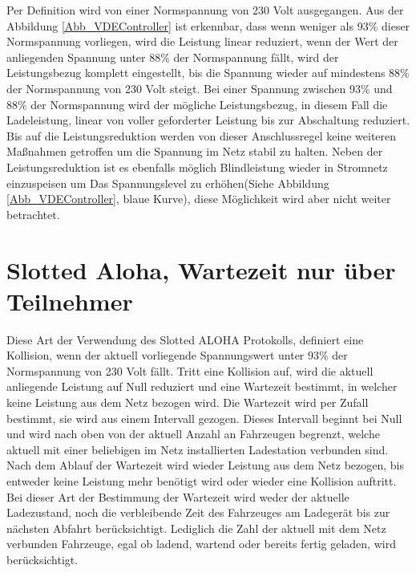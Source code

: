 Per Definition wird von einer Normspannung von 230 Volt ausgegangen. Aus der Abbildung \ref{Abb_VDEController} ist erkennbar, dass wenn weniger als 93\% dieser Normspannung vorliegen, wird die Leistung linear reduziert, wenn der Wert der anliegenden Spannung unter 88\% der Normspannung fällt, wird der Leistungsbezug komplett eingestellt, bis die Spannung wieder auf mindestens 88\% der Normspannung von 230 Volt steigt. Bei einer Spannung zwischen 93\% und 88\% der Normspannung wird der mögliche Leistungsbezug, in diesem Fall die Ladeleistung, linear von voller geforderter Leistung bis zur Abschaltung reduziert.\\
Bis auf die Leistungsreduktion werden von dieser Anschlussregel keine weiteren Maßnahmen getroffen um die Spannung im Netz stabil zu halten. 
Neben der Leistungsreduktion ist es ebenfalls möglich Blindleistung wieder in Stromnetz einzuspeisen um Das Spannungslevel zu erhöhen(Siehe Abbildung \ref{Abb_VDEController}, blaue Kurve), diese Möglichkeit wird aber nicht weiter betrachtet.

\section{Slotted Aloha, Wartezeit nur über Teilnehmer}
\label{cap:background_sec:SA_participants}
Diese Art der Verwendung des Slotted ALOHA Protokolls, definiert eine Kollision, wenn der aktuell vorliegende Spannungswert unter 93\% der Normspannung von 230 Volt fällt. Tritt eine Kollision auf, wird die aktuell anliegende Leistung auf Null reduziert und eine Wartezeit bestimmt, in welcher keine Leistung aus dem Netz bezogen wird. Die Wartezeit wird per Zufall bestimmt, sie wird aus einem Intervall gezogen. Dieses Intervall beginnt  bei Null und wird nach oben von der aktuell Anzahl an Fahrzeugen begrenzt, welche aktuell mit einer beliebigen im Netz installierten Ladestation verbunden sind. Nach dem Ablauf der Wartezeit wird wieder Leistung aus dem Netz bezogen, bis entweder keine Leistung mehr benötigt wird oder wieder eine Kollision auftritt.
Bei dieser Art der Bestimmung der Wartezeit wird weder der aktuelle Ladezustand, noch die verbleibende Zeit des Fahrzeuges am Ladegerät bis zur nächsten Abfahrt berücksichtigt. Lediglich die Zahl der aktuell mit dem Netz verbunden Fahrzeuge, egal ob ladend, wartend oder bereits fertig geladen, wird berücksichtigt.

